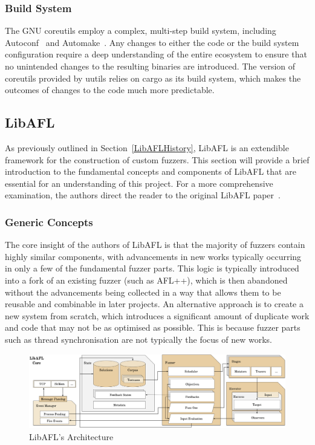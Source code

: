 \documentclass{article}
\let\savedCite=\cite
\renewcommand{\cite}{\unskip~\savedCite}
\begin{document}
\begin{multicols}{2}
    \subsubsection{Build System}
    \label{CoreutilsBuildSystem}

    The GNU coreutils employ a complex, multi-step build system, including Autoconf\cite{Autoconf} and Automake\cite{Automake}. Any changes to either the code or the build system configuration require a deep understanding of the entire ecosystem to ensure that no unintended changes to the resulting binaries are introduced. The version of coreutils provided by uutils relies on cargo as its build system, which makes the outcomes of changes to the code much more predictable.

    \subsection{LibAFL}
    \label{LibAFLBackground}
    As previously outlined in Section~\ref{LibAFLHistory}, LibAFL is an extendible framework for the construction of custom fuzzers. This section will provide a brief introduction to the fundamental concepts and components of LibAFL that are essential for an understanding of this project. For a more comprehensive examination, the authors direct the reader to the original LibAFL paper\cite{LibAFL}.

    \subsubsection{Generic Concepts}
    The core insight of the authors of LibAFL is that the majority of fuzzers contain highly similar components, with advancements in new works typically occurring in only a few of the fundamental fuzzer parts. This logic is typically introduced into a fork of an existing fuzzer (such as AFL++), which is then abandoned without the advancements being collected in a way that allows them to be reusable and combinable in later projects. An alternative approach is to create a new system from scratch, which introduces a significant amount of duplicate work and code that may not be as optimised as possible. This is because fuzzer parts such as thread synchronisation are not typically the focus of new works.

\end{multicols}
\begin{figure}[htbp]
    \centering
    \includegraphics[width=\textwidth]{assets/LibAFLArchitecture.png}
    \caption{LibAFL's Architecture\cite{LibAFL}}
    \label{fig:LibAFLArchitecture}
\end{figure}
\end{document}
